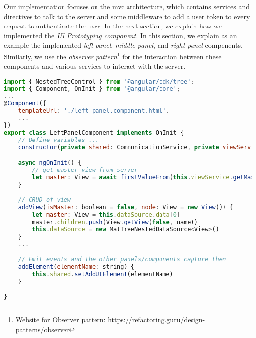 Our implementation focuses on the \ac{mvc} architecture, which contains services and directives to talk to the server and some middleware to add a user token to every request to authenticate the user. In the next section, we explain how we implemented the \textit{UI Prototyping component}.
In this section, we explain as an example the implemented \textit{left-panel}, \textit{middle-panel}, and \textit{right-panel} components. 
Similarly, we use the \textit{observer pattern}\footnote{Website for Observer pattern: \url{https://refactoring.guru/design-patterns/observer}} for the interaction between these components and various services to interact with the server.

\begin{lstlisting}[language=JavaScript, caption=left-panel.component.ts, label=listing:implementation:left]
import { NestedTreeControl } from '@angular/cdk/tree';
import { Component, OnInit } from '@angular/core';
...
@Component({
    templateUrl: './left-panel.component.html',
    ...
})
export class LeftPanelComponent implements OnInit {
    // Define variables ...
    constructor(private shared: CommunicationService, private viewService: ViewsService, ...) { }

    async ngOnInit() {
        // get master view from server
        let master: View = await firstValueFrom(this.viewService.getMasterView())
    }

    // CRUD of view
    addView(isMaster: boolean = false, node: View = new View()) {
        let master: View = this.dataSource.data[0]
        master.children.push(View.getView(false, name))
        this.dataSource = new MatTreeNestedDataSource<View>()
    }
    ...

    // Emit events and the other panels/components capture them
    addElement(elementName: string) {
        this.shared.setAddUIElement(elementName)
    }

}    
\end{lstlisting}
